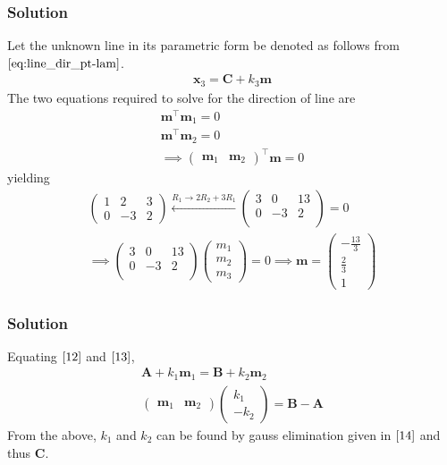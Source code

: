 \documentclass{beamer}
\theoremstyle{remark}
\newcommand{\myvec}[1]{\ensuremath{\begin{pmatrix}#1\end{pmatrix}}}
\let\vec\mathbf
\begin{document}
\begin{frame}
\frametitle{Solution}
Let the unknown line in its parametric form be denoted as follows from $\eqref{eq:line_dir_pt-lam}$.
\begin{align}
    \vec{x}_3 = \vec{C} + k_3\vec{m}
\end{align}
The two equations required to solve for the direction of line are 
\begin{align}
\vec{m}^\top\vec{m}_1 = 0\\
\vec{m}^\top\vec{m}_2 = 0\\
	\implies \myvec{\vec{m}_1 &\vec{m}_2}^{\top}\vec{m} = 0
\end{align}
yielding
\begin{align}
    \myvec{
        1 & 2 & 3\\
        0 & -3 & 2   
    } \xleftarrow{R_1 \to 2R_2 + 3R_1} \myvec{
        3 & 0 & 13\\
        0 & -3 & 2   \\
    } = 0\\
  \implies  \myvec{
        3 & 0 & 13\\
        0 & -3 & 2   \\
    }\myvec{
        m_1\\
        m_2\\
        m_3
    } = 0
    \implies \vec{m} = \myvec{
	    -\frac{13}{3}\\[1ex]
        \frac{2}{3}\\[1ex]
        1
    }
\end{align}
\end{frame}
%
\begin{frame}
\frametitle{Solution}
Equating $\eqref{12}$ and $\eqref{13}$,
\begin{align}
    \vec{A} + k_1\vec{m}_1 = \vec{B} + k_2\vec{m}_2\\
    \myvec{
        \vec{m}_1 & \vec{m}_2
    }\myvec{
        k_1 \\
        -k_2
    } = \vec{B}-\vec{A}
	\label{eq:non-skew}
\end{align}
From the above, $k_1$ and $k_2$ can be found by gauss elimination given in $\eqref{14}$ and thus $\vec{C}$.

\end{frame}
\end{document}
